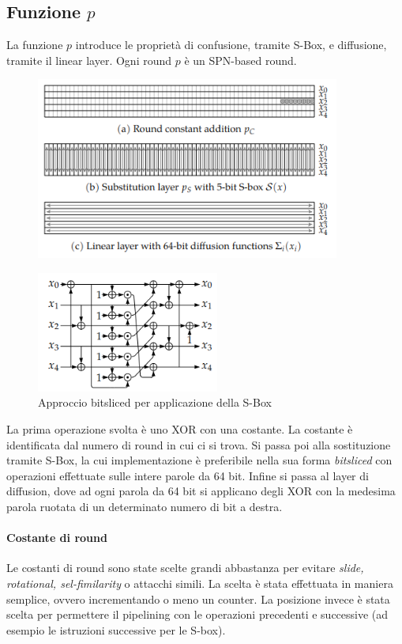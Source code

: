 \subsection{Funzione $p$}
La funzione $p$ introduce le proprietà di confusione, tramite S-Box, e diffusione, tramite il linear layer. Ogni round $p$ è un SPN-based round.  
\begin{figure}[h!]
    \centering
    \includegraphics[width=10cm]{images/p.png}
\end{figure}
\begin{figure}[h!]
    \centering
    \includegraphics[width=6cm]{images/sbox.png}
    \caption[short]{Approccio bitsliced per applicazione della S-Box}
\end{figure}
\newline
La prima operazione svolta è uno XOR con una costante. La costante è identificata dal numero di round in cui ci si trova. Si passa poi alla sostituzione tramite S-Box, la cui implementazione è preferibile nella sua forma \textsl{bitsliced} con operazioni effettuate sulle intere parole da 64 bit. Infine si passa al layer di diffusion, dove ad ogni parola da 64 bit si applicano degli XOR con la medesima parola ruotata di un determinato numero di bit a destra. 
\paragraph*{Costante di round}
Le costanti di round sono state scelte grandi abbastanza per evitare \textsl{slide, rotational, sel-fimilarity} o attacchi simili. La scelta è stata effettuata in maniera semplice, ovvero incrementando o meno un counter. La posizione invece è stata scelta per permettere il pipelining con le operazioni precedenti e successive (ad esempio le istruzioni successive per le S-box). 
